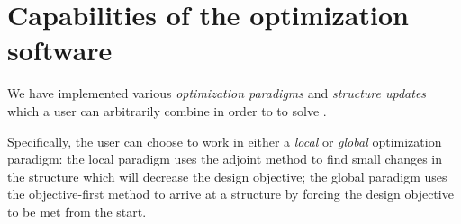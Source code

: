 % 


\section{Capabilities of the optimization software}
We have implemented various 
    \emph{optimization paradigms} and \emph{structure updates}
    which a user can arbitrarily combine in order to 
    to solve .

Specifically, the user can choose to work in either
    a \emph{local} or \emph{global} optimization paradigm:
    \BI the local paradigm uses the adjoint method
            to find small changes in the structure which
            will decrease the design objective;
    \I  the global paradigm uses the objective-first method
            to arrive at a structure by forcing
            the design objective to be met from the start. \EI

